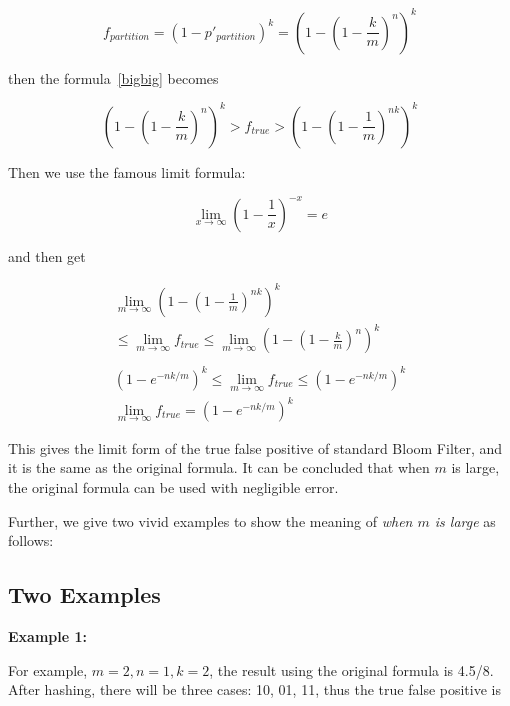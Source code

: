 \begin{equation}
f_{partition}=(1-p'_{partition})^k=\left( 1- \left( 1-\dfrac{k}{m} \right)^n \right) ^k
\end{equation}

then the formula~\ref{bigbig} becomes

\begin{equation}
\left( 1- \left( 1-\dfrac{k}{m} \right)^n \right) ^k > f_{true} > \left( 1- \left( 1-\dfrac{1}{m} \right)^{nk} \right) ^k
\end{equation}

Then we use the famous limit formula:

\begin{equation}
\lim\limits_{x \to \infty} \left( 1-\dfrac{1}{x}\right) ^{-x} = e
\end{equation}

and then get

\begin{equation}
\label{flim}
\begin{aligned}
\lim\limits_{m \to \infty} \left(1-\left(1-\frac{1}{m}\right)^{nk}\right)^k  \\ \leq   \lim\limits_{m \to \infty}  f_{true} \leq   \lim\limits_{m \to \infty} {\left(1-\left(1-\frac{k}{m}\right)^n\right)^k }    \\
  \\
 \left(1-e^{-nk/m}\right)^k \leq  \lim\limits_{m \to \infty} f_{true}  \leq  \left(1-e^{-nk/m}\right)^k  \\
\lim\limits_{m \to \infty} f_{true}=\left(1-e^{-nk/m}\right)^k
\end{aligned}
\end{equation}

This gives the limit form of the true false positive of standard Bloom Filter, and it is the same as the original formula. It can be concluded that when $m$ is large, the original formula can be used with negligible error.

Further, we give two vivid examples to show the meaning of \textit{when $m$ is large} as follows:

\subsection{Two Examples}

\textbf{Example 1:}

For example, $m=2, n=1, k=2$, the result using the original formula is 4.5/8.
After hashing, there will be three cases: 10, 01, 11, thus the true false positive is 

